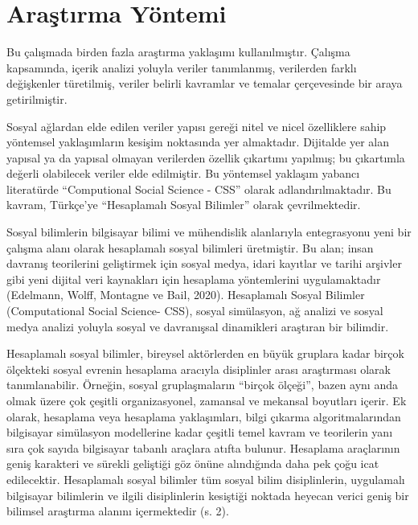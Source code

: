 \documentclass[
]{book}
\begin{document}
\hypertarget{araux15ftux131rma-yuxf6ntemi}{%
\section{Araştırma Yöntemi}\label{araux15ftux131rma-yuxf6ntemi}}

Bu çalışmada birden fazla araştırma yaklaşımı kullanılmıştır. Çalışma kapsamında, içerik analizi \citep{yildirim2018sosyal} yoluyla veriler tanımlanmış, verilerden farklı değişkenler türetilmiş, veriler belirli kavramlar ve temalar çerçevesinde bir araya getirilmiştir.

Sosyal ağlardan elde edilen veriler yapısı gereği nitel ve nicel özelliklere sahip yöntemsel yaklaşımların kesişim noktasında yer almaktadır. Dijitalde yer alan yapısal ya da yapısal olmayan verilerden özellik çıkartımı yapılmış; bu çıkartımla değerli olabilecek veriler elde edilmiştir. Bu yöntemsel yaklaşım yabancı literatürde ``Computional Social Science - CSS'' olarak adlandırılmaktadır. Bu kavram, Türkçe'ye ``Hesaplamalı Sosyal Bilimler'' olarak çevrilmektedir.

Sosyal bilimlerin bilgisayar bilimi ve mühendislik alanlarıyla entegrasyonu yeni bir çalışma alanı olarak hesaplamalı sosyal bilimleri üretmiştir. Bu alan; insan davranış teorilerini geliştirmek için sosyal medya, idari kayıtlar ve tarihi arşivler gibi yeni dijital veri kaynakları için hesaplama yöntemlerini uygulamaktadır (Edelmann, Wolff, Montagne ve Bail, 2020). Hesaplamalı Sosyal Bilimler (Computational Social Science- CSS), sosyal simülasyon, ağ analizi ve sosyal medya analizi yoluyla sosyal ve davranışsal dinamikleri araştıran bir bilimdir. \citep{taylor2022csssa}

Hesaplamalı sosyal bilimler, bireysel aktörlerden en büyük gruplara kadar birçok ölçekteki sosyal evrenin hesaplama aracıyla disiplinler arası araştırması olarak tanımlanabilir. Örneğin, sosyal gruplaşmaların ``birçok ölçeği'', bazen aynı anda olmak üzere çok çeşitli organizasyonel, zamansal ve mekansal boyutları içerir. Ek olarak, hesaplama veya hesaplama yaklaşımları, bilgi çıkarma algoritmalarından bilgisayar simülasyon modellerine kadar çeşitli temel kavram ve teorilerin yanı sıra çok sayıda bilgisayar tabanlı araçlara atıfta bulunur. Hesaplama araçlarının geniş karakteri ve sürekli geliştiği göz önüne alındığında daha pek çoğu icat edilecektir. Hesaplamalı sosyal bilimler tüm sosyal bilim disiplinlerin, uygulamalı bilgisayar bilimlerin ve ilgili disiplinlerin kesiştiği noktada heyecan verici geniş bir bilimsel araştırma alanını içermektedir (s. 2). \citep{cioffirevilla2017}
\end{document}
